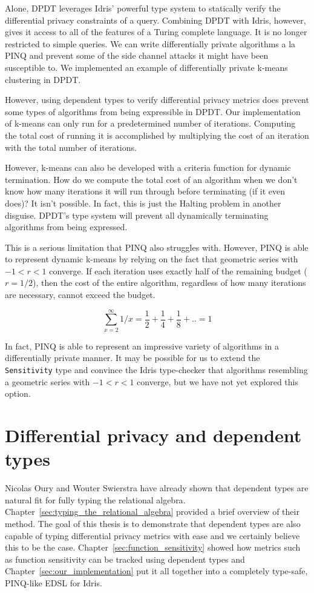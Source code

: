 \documentclass[12pt]{report}
\begin{document}
Alone, DPDT leverages Idris' powerful type system to statically verify the differential privacy constraints of a query.
Combining DPDT with Idris, however, gives it access to all of the features of a Turing complete language.
It is no longer restricted to simple queries.
We can write differentially private algorithms a la PINQ and prevent some of the side channel attacks it might have been susceptible to.
We implemented an example of differentially private k-means clustering in DPDT.

However, using dependent types to verify differential privacy metrics does prevent some types of algorithms from being expressible in DPDT.
Our implementation of k-means can only run for a predetermined number of iterations.
Computing the total cost of running it is accomplished by multiplying the cost of an iteration with the total number of iterations.

However, k-means can also be developed with a criteria function for dynamic termination.
How do we compute the total cost of an algorithm when we don't know how many iterations it will run through before terminating (if it even does)?
It isn't possible.
In fact, this is just the Halting problem in another disguise.
DPDT's type system will prevent all dynamically terminating algorithms from being expressed.

This is a serious limitation that PINQ also struggles with.
However, PINQ is able to represent dynamic k-means by relying on the fact that geometric series with $-1 < r < 1$ converge.
If each iteration uses exactly half of the remaining budget ($r=1/2$), then the cost of the entire algorithm, regardless of how many iterations are necessary, cannot exceed the budget.

$$\sum_{x=2}^{\infty} 1/x = \frac{1}{2} + \frac{1}{4} + \frac{1}{8} + .. = 1$$

In fact, PINQ is able to represent an impressive variety of algorithms in a differentially private manner.
It may be possible for us to extend the \texttt{Sensitivity} type and convince the Idris type-checker that algorithms resembling a geometric series with $-1 < r < 1$ converge, but we have not yet explored this option.

\section{Differential privacy and dependent types}

Nicolas Oury and Wouter Swierstra have already shown that dependent types are natural fit for fully typing the relational algebra\cite{OurySwierstra08PowerOfPi}.
Chapter~\ref{sec:typing_the_relational_algebra} provided a brief overview of their method.
The goal of this thesis is to demonstrate that dependent types are also capable of typing differential privacy metrics with ease and we certainly believe this to be the case.
Chapter~\ref{sec:function_sensitivity} showed how metrics such as function sensitivity can be tracked using dependent types and Chapter~\ref{sec:our_implementation} put it all together into a completely type-safe, PINQ-like EDSL for Idris.
\end{document}
